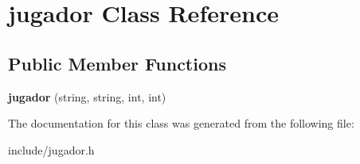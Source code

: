 \hypertarget{classjugador}{}\section{jugador Class Reference}
\label{classjugador}
\subsection*{Public Member Functions}
\begin{DoxyCompactItemize}
\item 
\mbox{\label{classjugador_a69832c0a6d6de3b97ad0cd21879168ce}} 
{\bfseries jugador} (string, string, int, int)
\end{DoxyCompactItemize}


The documentation for this class was generated from the following file\+:\begin{DoxyCompactItemize}
\item 
include/jugador.\+h\end{DoxyCompactItemize}
